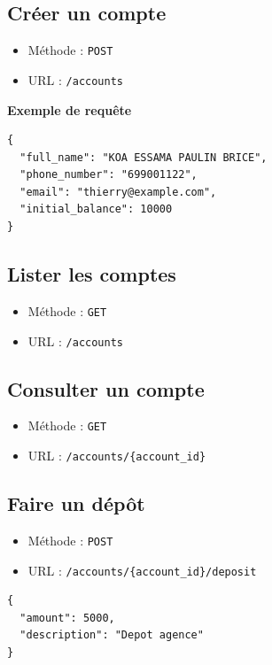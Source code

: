 \documentclass[12pt,a4paper]{article}
\begin{document}
\subsection{Créer un compte}

\begin{itemize}
    \item Méthode : \texttt{POST}
    \item URL : \texttt{/accounts}
\end{itemize}

\textbf{Exemple de requête}

\begin{verbatim}
{
  "full_name": "KOA ESSAMA PAULIN BRICE",
  "phone_number": "699001122",
  "email": "thierry@example.com",
  "initial_balance": 10000
}
\end{verbatim}

\subsection{Lister les comptes}

\begin{itemize}
    \item Méthode : \texttt{GET}
    \item URL : \texttt{/accounts}
\end{itemize}

\subsection{Consulter un compte}

\begin{itemize}
    \item Méthode : \texttt{GET}
    \item URL : \texttt{/accounts/\{account\_id\}}
\end{itemize}

\subsection{Faire un dépôt}

\begin{itemize}
    \item Méthode : \texttt{POST}
    \item URL : \texttt{/accounts/\{account\_id\}/deposit}
\end{itemize}

\begin{verbatim}
{
  "amount": 5000,
  "description": "Depot agence"
}
\end{verbatim}
\end{document}
